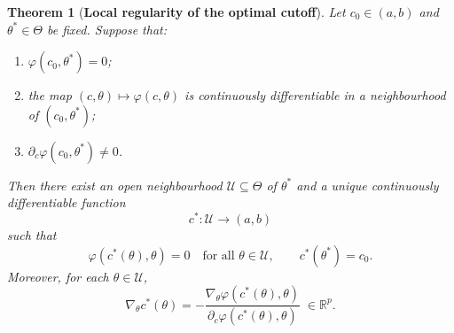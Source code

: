 \documentclass[11pt,a4paper]{article}
\newtheorem{theorem}{Theorem}[section]
\theoremstyle{definition}
\theoremstyle{remark}
\newcommand{\1}{\mathbf{1}}
\begin{document}
\begin{theorem}[\textbf{Local regularity of the optimal cutoff}]
\label{thm:regularity}
Let $c_0\in(a,b)$ and $\theta^*\in\Theta$ be fixed.
Suppose that:
\begin{enumerate}
    \item $\varphi(c_0,\theta^*)=0$;

    \item the map $(c,\theta)\mapsto\varphi(c,\theta)$ is
          continuously differentiable in a neighbourhood of
          $(c_0,\theta^*)$;

    \item $\partial_c\varphi(c_0,\theta^*)\neq 0$.
\end{enumerate}
Then there exist an open neighbourhood
$\mathcal U\subseteq\Theta$ of $\theta^*$ and a unique
continuously differentiable function
\[
c^*:\mathcal U\longrightarrow(a,b)
\]
such that
\[
\varphi\!\left(c^*(\theta),\theta\right)=0
\quad\text{for all }\theta\in\mathcal U,
\qquad
c^*(\theta^*)=c_0.
\]
Moreover, for each $\theta\in\mathcal U$,
\[
\nabla_\theta c^*(\theta)
=
-
\frac{\nabla_\theta \varphi\!\left(c^*(\theta),\theta\right)}
{\partial_c\varphi\!\left(c^*(\theta),\theta\right)}
\;\in\mathbb R^p.
\]
\end{theorem}
\end{document}
